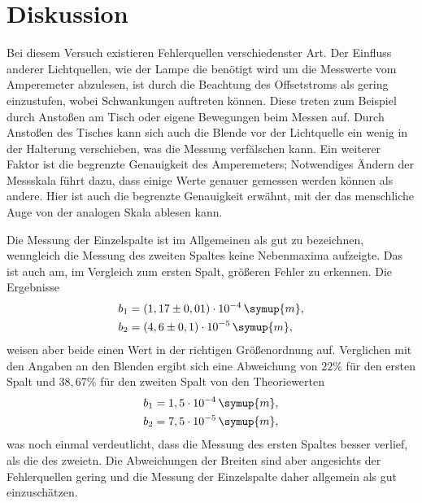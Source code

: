 \section{Diskussion}
\label{sec:Diskussion}
Bei diesem Versuch existieren Fehlerquellen verschiedenster Art. Der Einfluss anderer Lichtquellen, wie der Lampe die benötigt wird um 
die Messwerte vom Amperemeter abzulesen, ist durch die Beachtung des Offsetstroms als gering einzustufen, wobei Schwankungen auftreten können.
Diese treten zum Beispiel durch Anstoßen am Tisch oder eigene Bewegungen beim Messen auf. Durch Anstoßen des Tisches kann sich auch die Blende 
vor der Lichtquelle ein wenig in der Halterung verschieben, was die Messung verfälschen kann. Ein weiterer Faktor ist die begrenzte Genauigkeit
des Amperemeters; Notwendiges Ändern der Messskala führt dazu, dass einige Werte genauer gemessen werden können als andere. Hier ist auch die 
begrenzte Genauigkeit erwähnt, mit der das menschliche Auge von der analogen Skala ablesen kann. 

Die Messung der Einzelspalte ist im Allgemeinen als gut zu bezeichnen, wenngleich die Messung des zweiten Spaltes keine Nebenmaxima aufzeigte.
Das ist auch am, im Vergleich zum ersten Spalt, größeren Fehler zu erkennen. Die Ergebnisse
\begin{align*}
    b_1 &= (1,17 \pm 0,01) \cdot 10^{-4}\, \symup{m}, \\
    b_2 &= (4,6\pm 0,1) \cdot 10^{-5}   \, \symup{m},
\end{align*}
weisen aber beide einen Wert in der richtigen Größenordnung auf. Verglichen mit den Angaben an den Blenden ergibt sich eine Abweichung von 
$22 \%$ für den ersten Spalt und $38,67 \%$ für den zweiten Spalt von den Theoriewerten
\begin{align*}
     b_1 &= 1,5 \cdot 10^{-4} \,  \symup{m}, \\
     b_2 &= 7,5 \cdot 10^{-5} \, \symup{m},
\end{align*}
was noch einmal verdeutlicht, dass die Messung des ersten Spaltes besser verlief, als die des zweietn.
Die Abweichungen der Breiten sind aber angesichts der Fehlerquellen gering und die Messung der Einzelspalte daher allgemein als gut einzuschätzen.

